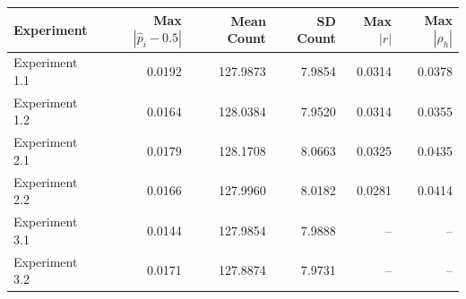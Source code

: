 \begin{tabular}{lrrrrr}
\hline
Experiment & Max $|\hat p_i-0.5|$ & Mean Count & SD Count & Max $|r|$ & Max $|\rho_h|$ \\
\hline
Experiment 1.1 & 0.0192 & 127.9873 & 7.9854 & 0.0314 & 0.0378 \\
Experiment 1.2 & 0.0164 & 128.0384 & 7.9520 & 0.0314 & 0.0355 \\
Experiment 2.1 & 0.0179 & 128.1708 & 8.0663 & 0.0325 & 0.0435 \\
Experiment 2.2 & 0.0166 & 127.9960 & 8.0182 & 0.0281 & 0.0414 \\
Experiment 3.1 & 0.0144 & 127.9854 & 7.9888 & -- & -- \\
Experiment 3.2 & 0.0171 & 127.8874 & 7.9731 & -- & -- \\
\hline
\end{tabular}
